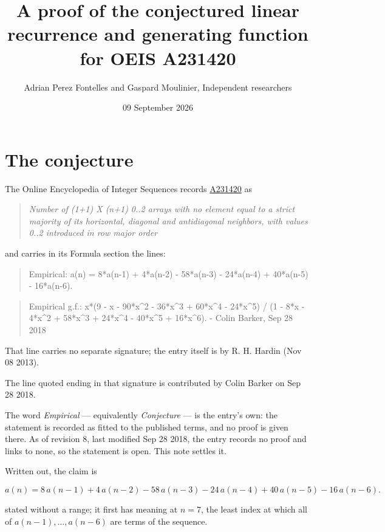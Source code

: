 \documentclass[11pt]{article}
\title{A proof of the conjectured linear recurrence and generating function for OEIS A231420}
\author{Adrian Perez Fontelles and Gaspard Moulinier, Independent researchers}
\date{09 September 2026}
\theoremstyle{definition}
\begin{document}
\maketitle
\section{The conjecture}

The Online Encyclopedia of Integer Sequences records \href{https://oeis.org/A231420}{A231420} as

\begin{quote}\itshape Number of (1+1) X (n+1) 0..2 arrays with no element equal to a strict majority of its horizontal, diagonal and antidiagonal neighbors, with values 0..2 introduced in row major order\end{quote}

and carries in its Formula section the lines:

\begin{quote}\ttfamily Empirical: a(n) = 8*a(n-1) + 4*a(n-2) - 58*a(n-3) - 24*a(n-4) + 40*a(n-5) - 16*a(n-6).\end{quote}

\begin{quote}\ttfamily Empirical g.f.: x*(9 - x - 90*x\textasciicircum{}2 - 36*x\textasciicircum{}3 + 60*x\textasciicircum{}4 - 24*x\textasciicircum{}5) / (1 - 8*x - 4*x\textasciicircum{}2 + 58*x\textasciicircum{}3 + 24*x\textasciicircum{}4 - 40*x\textasciicircum{}5 + 16*x\textasciicircum{}6). - Colin Barker, Sep 28 2018\end{quote}

That line carries no separate signature; the entry itself is by R. H. Hardin (Nov 08 2013).

The line quoted ending in that signature is contributed by Colin Barker on Sep 28 2018.

The word {\itshape Empirical} --- equivalently {\itshape Conjecture} --- is the entry's own: the statement is recorded as fitted to the published terms, and no proof is given there. As of revision 8, last modified Sep 28 2018, the entry records no proof and links to none, so the statement is open. This note settles it.

Written out, the claim is

\[a(n) = 8\,a(n-1) + 4\,a(n-2) - 58\,a(n-3) - 24\,a(n-4) + 40\,a(n-5) - 16\,a(n-6).\]

stated without a range; it first has meaning at $n = 7$, the least index at which all of $a(n-1),\dots,a(n-6)$ are terms of the sequence.
\end{document}
